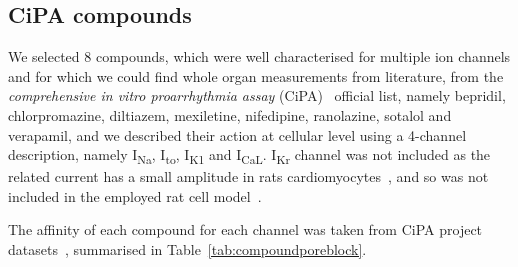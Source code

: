 \subsection{CiPA compounds}\label{sec:ch6cipa_compounds}
We selected $8$ compounds, which were well characterised for multiple ion channels and for which we could find whole organ measurements from literature, from the \textit{comprehensive in vitro proarrhythmia assay} (\acs{CiPA})~\cite{Park:2019} official list, namely bepridil, chlorpromazine, diltiazem, mexiletine, nifedipine, ranolazine, sotalol and verapamil, and we described their action at cellular level using a 4-channel description, namely I\textsubscript{Na}, I\textsubscript{to}, I\textsubscript{K1} and I\textsubscript{CaL}. I\textsubscript{Kr} channel was not included as the related current has a small amplitude in rats cardiomyocytes~\cite{Wymore:1997}, and so was not included in the employed rat cell model~\cite{Gattoni:2017}.

\vspace{0.2cm}
The affinity of each compound for each channel was taken from CiPA project datasets~\cite{Li:2018, Li:2019}, summarised in Table~\ref{tab:compoundporeblock}.

